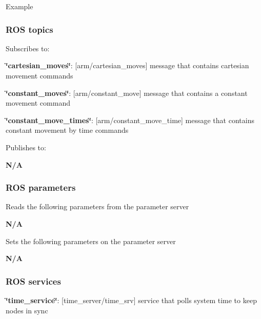 \begin{DoxyParagraph}{\-Example}

\end{DoxyParagraph}
\subsubsection{\-R\-O\-S topics}\label{index_topics}
\-Subscribes to\-:
\begin{DoxyItemize}
\item {\bfseries \char`\"{}cartesian\-\_\-moves\char`\"{}}\-: [arm/cartesian\-\_\-moves] message that contains cartesian movement commands
\item {\bfseries \char`\"{}constant\-\_\-moves\char`\"{}}\-: [arm/constant\-\_\-move] message that contains a constant movement command
\item {\bfseries \char`\"{}constant\-\_\-move\-\_\-times\char`\"{}}\-: [arm/constant\-\_\-move\-\_\-time] message that contains constant movement by time commands
\end{DoxyItemize}

\-Publishes to\-:
\begin{DoxyItemize}
\item {\bfseries \-N/\-A} 
\end{DoxyItemize}\subsubsection{\-R\-O\-S parameters}\label{index_parameters}
\-Reads the following parameters from the parameter server


\begin{DoxyItemize}
\item {\bfseries \-N/\-A} 
\end{DoxyItemize}

\-Sets the following parameters on the parameter server


\begin{DoxyItemize}
\item {\bfseries \-N/\-A} 
\end{DoxyItemize}\subsubsection{\-R\-O\-S services}\label{index_services}

\begin{DoxyItemize}
\item {\bfseries \char`\"{}time\-\_\-service\char`\"{}}\-: [time\-\_\-server/time\-\_\-srv] service that polls system time to keep nodes in sync
\end{DoxyItemize}



